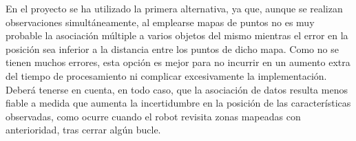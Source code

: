 En el proyecto se ha utilizado la primera alternativa, ya que, aunque se realizan observaciones simultáneamente, al emplearse mapas de puntos no es muy probable la asociación múltiple a varios objetos del mismo mientras el error en la posición sea inferior a la distancia entre los puntos de dicho mapa. Como no se tienen muchos errores, esta opción es mejor para no incurrir en un aumento extra del tiempo de procesamiento ni complicar excesivamente la implementación. Deberá tenerse en cuenta, en todo caso, que la asociación de datos resulta menos fiable a medida que aumenta la incertidumbre en la posición de las características observadas, como ocurre cuando el robot revisita zonas mapeadas con anterioridad, tras cerrar algún bucle.

